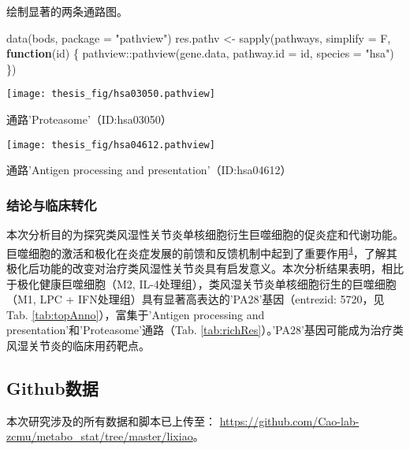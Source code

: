 \documentclass[
]{article}
\newenvironment{Shaded}{\begin{snugshade}}{\end{snugshade}}
\newcommand{\AttributeTok}[1]{\textcolor[rgb]{0.77,0.63,0.00}{#1}}
\newcommand{\ControlFlowTok}[1]{\textcolor[rgb]{0.13,0.29,0.53}{\textbf{#1}}}
\newcommand{\FunctionTok}[1]{\textcolor[rgb]{0.00,0.00,0.00}{#1}}
\newcommand{\NormalTok}[1]{#1}
\newcommand{\OtherTok}[1]{\textcolor[rgb]{0.56,0.35,0.01}{#1}}
\newcommand{\SpecialCharTok}[1]{\textcolor[rgb]{0.00,0.00,0.00}{#1}}
\newcommand{\StringTok}[1]{\textcolor[rgb]{0.31,0.60,0.02}{#1}}
\begin{document}
绘制显著的两条通路图。

\begin{Shaded}
\begin{Highlighting}[]
\FunctionTok{data}\NormalTok{(bods, }\AttributeTok{package =} \StringTok{"pathview"}\NormalTok{)}
\NormalTok{res.pathv }\OtherTok{\textless{}{-}} \FunctionTok{sapply}\NormalTok{(pathways, }\AttributeTok{simplify =}\NormalTok{ F,}
  \ControlFlowTok{function}\NormalTok{(id) \{}
\NormalTok{    pathview}\SpecialCharTok{::}\FunctionTok{pathview}\NormalTok{(gene.data, }\AttributeTok{pathway.id =}\NormalTok{ id, }\AttributeTok{species =} \StringTok{"hsa"}\NormalTok{)}
\NormalTok{  \})}
\end{Highlighting}
\end{Shaded}

\bgroup {}
\texttt{[image: thesis\_fig/hsa03050.pathview]} \caption{通路'Proteasome'（ID:hsa03050）}\label{fig:keggPath}
\makeatletter \egroup

\bgroup {}
\texttt{[image: thesis\_fig/hsa04612.pathview]} \caption{通路'Antigen processing and presentation'（ID:hsa04612）}\label{fig:fig10}
\makeatletter \egroup

\hypertarget{ux7ed3ux8bbaux4e0eux4e34ux5e8aux8f6cux5316}{%
\subsubsection{结论与临床转化}\label{ux7ed3ux8bbaux4e0eux4e34ux5e8aux8f6cux5316}}

本次分析目的为探究类风湿性关节炎单核细胞衍生巨噬细胞的促炎症和代谢功能。巨噬细胞的激活和极化在炎症发展的前馈和反馈机制中起到了重要作用\textsuperscript{\protect\hyperlink{ref-hu_regulation_2008}{4}}，了解其极化后功能的改变对治疗类风湿性关节炎具有启发意义。本次分析结果表明，相比于极化健康巨噬细胞（M2, IL-4处理组），类风湿关节炎单核细胞衍生的巨噬细胞（M1, LPC + IFN处理组）具有显著高表达的'PA28'基因（entrezid: 5720，见Tab. \ref{tab:topAnno}），富集于'Antigen processing and presentation'和'Proteasome'通路（Tab. \ref{tab:richRes}）。'PA28'基因可能成为治疗类风湿关节炎的临床用药靶点。

\hypertarget{githubux6570ux636e}{%
\subsection{Github数据}\label{githubux6570ux636e}}

本次研究涉及的所有数据和脚本已上传至：
\url{https://github.com/Cao-lab-zcmu/metabo_stat/tree/master/lixiao}。
\end{document}
